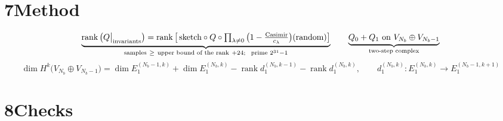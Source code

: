 \documentclass[10pt]{article}
\begin{document}
\section*{7\quad Method}
\[
\underbrace{\operatorname{rank}\big(Q\big|_{\rm invariants}\big)=\operatorname{rank}\big[\,\text{sketch}\circ Q\circ\textstyle\prod_{\lambda\neq0}\big(1-\tfrac{\text{Casimir}}{c_\lambda}\big)(\text{random})\big]}_{\text{samples}\ \ge\ \text{upper bound of the rank}\ +24;\ \ \text{prime }2^{31}-1}
\qquad
\underbrace{Q_0+Q_1\ \text{on}\ V_{N_b}\oplus V_{N_b-1}}_{\text{two-step complex}}
\]
\[
\dim H^k\big(V_{N_b}\oplus V_{N_b-1}\big)=\dim E_1^{(N_b-1,k)}+\dim E_1^{(N_b,k)}-\operatorname{rank}d_1^{(N_b,k-1)}-\operatorname{rank}d_1^{(N_b,k)},\qquad d_1^{(N_b,k)}:E_1^{(N_b,k)}\to E_1^{(N_b-1,k+1)}
\]

\section*{8\quad Checks}
\end{document}
